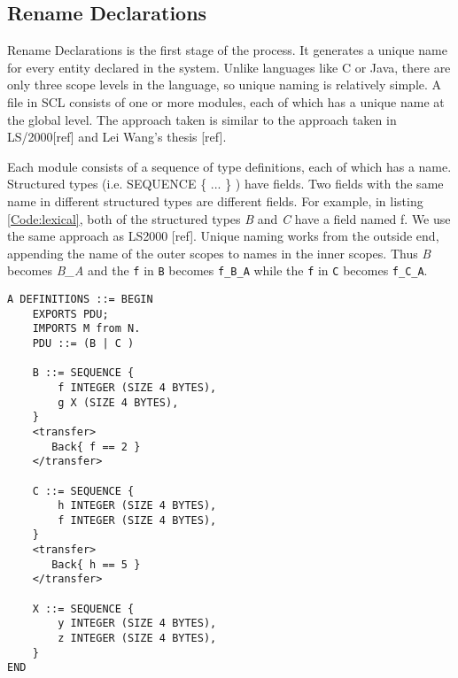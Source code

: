 \documentclass[12pt,oneside,letterpaper]{article}
\begin{document}

\subsection{Rename Declarations}
\label{sec:RenameDeclarations}
Rename Declarations is the first stage of the process. It generates a unique name for every entity declared in the system.  Unlike languages like C or Java, there are only three scope levels in the language, so unique naming is relatively simple. A file in SCL consists of one or more modules, each of which has a unique name at the global level.  The approach taken is similar to the approach taken in LS/2000[ref] and Lei Wang's thesis [ref].

Each module consists of a sequence of type definitions, each of which has a name. Structured types (i.e. SEQUENCE \{ ... \} ) have fields. Two fields with the same name in different structured types are different fields. For example, in listing \ref{Code:lexical}, both of the structured types \textit{B} and \textit{C} have a field named f. We use the same approach as LS2000 [ref]. Unique naming  works from the outside end, appending the name of the outer scopes to names in the inner scopes. Thus \textit{B} becomes \textit{B\_A} and the \texttt{f} in \texttt{B} becomes \texttt{f\_B\_A} while the \texttt{f} in \texttt{C} becomes \texttt{f\_C\_A}.

\begin{lstlisting}[language=SCL2,style=mystyle,frame=none,
caption=Lexical Levels,label=Code:lexical, xleftmargin=3.5ex]
A DEFINITIONS ::= BEGIN
    EXPORTS PDU;
    IMPORTS M from N.
    PDU ::= (B | C )

    B ::= SEQUENCE {
        f INTEGER (SIZE 4 BYTES),
        g X (SIZE 4 BYTES),
    }
    <transfer>
       Back{ f == 2 }
    </transfer>
    
    C ::= SEQUENCE {
        h INTEGER (SIZE 4 BYTES),
        f INTEGER (SIZE 4 BYTES),
    }
    <transfer>
       Back{ h == 5 }
    </transfer>
    
    X ::= SEQUENCE {
        y INTEGER (SIZE 4 BYTES),
        z INTEGER (SIZE 4 BYTES),
    }
END
\end{lstlisting}
\end{document}
